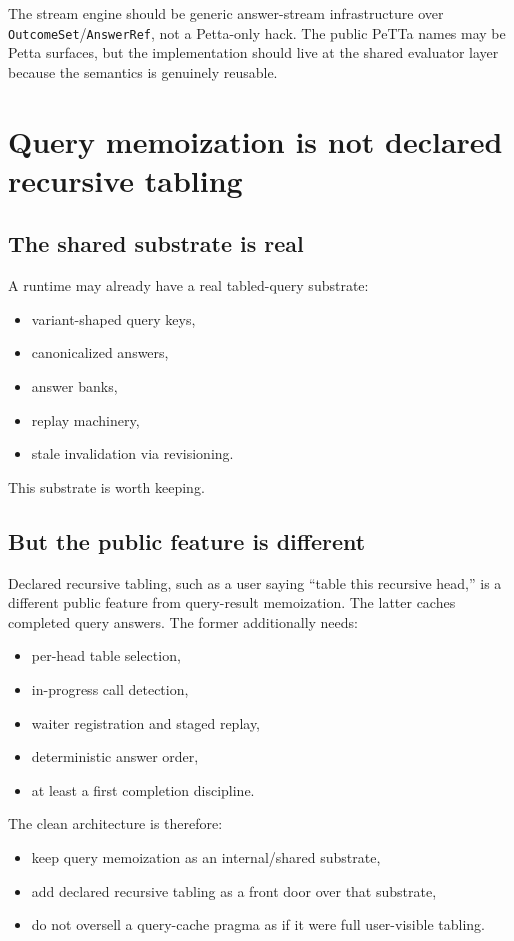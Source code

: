 \documentclass[11pt]{article}
\begin{document}
The stream engine should be generic answer-stream infrastructure over \texttt{OutcomeSet}/\texttt{AnswerRef}, not a Petta-only hack. The public PeTTa names may be Petta surfaces, but the implementation should live at the shared evaluator layer because the semantics is genuinely reusable.

\section{Query memoization is not declared recursive tabling}

\subsection{The shared substrate is real}

A runtime may already have a real tabled-query substrate:
\begin{itemize}
    \item variant-shaped query keys,
    \item canonicalized answers,
    \item answer banks,
    \item replay machinery,
    \item stale invalidation via revisioning.
\end{itemize}

This substrate is worth keeping.

\subsection{But the public feature is different}

Declared recursive tabling, such as a user saying ``table this recursive head,'' is a different public feature from query-result memoization. The latter caches completed query answers. The former additionally needs:
\begin{itemize}
    \item per-head table selection,
    \item in-progress call detection,
    \item waiter registration and staged replay,
    \item deterministic answer order,
    \item at least a first completion discipline.
\end{itemize}

The clean architecture is therefore:
\begin{itemize}
    \item keep query memoization as an internal/shared substrate,
    \item add declared recursive tabling as a front door over that substrate,
    \item do not oversell a query-cache pragma as if it were full user-visible tabling.
\end{itemize}
\end{document}
